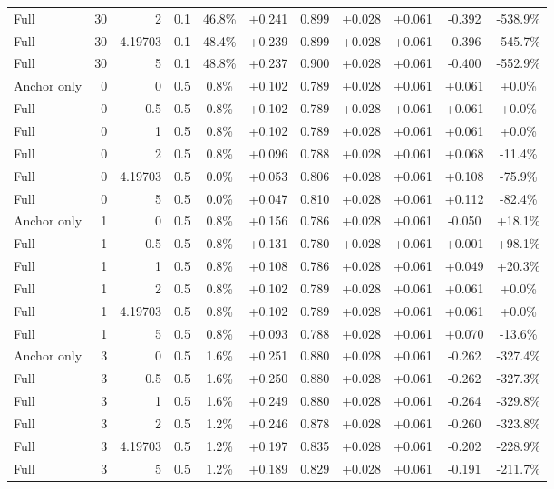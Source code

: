 \begin{table}[htbp]
\begin{tabular}{lrrrccccccc}
Full & 30 & 2 & 0.1 & 46.8\% & +0.241 & 0.899 & +0.028 & +0.061 & -0.392 & -538.9\% \\
Full & 30 & 4.19703 & 0.1 & 48.4\% & +0.239 & 0.899 & +0.028 & +0.061 & -0.396 & -545.7\% \\
Full & 30 & 5 & 0.1 & 48.8\% & +0.237 & 0.900 & +0.028 & +0.061 & -0.400 & -552.9\% \\
Anchor only & 0 & 0 & 0.5 & 0.8\% & +0.102 & 0.789 & +0.028 & +0.061 & +0.061 & +0.0\% \\
Full & 0 & 0.5 & 0.5 & 0.8\% & +0.102 & 0.789 & +0.028 & +0.061 & +0.061 & +0.0\% \\
Full & 0 & 1 & 0.5 & 0.8\% & +0.102 & 0.789 & +0.028 & +0.061 & +0.061 & +0.0\% \\
Full & 0 & 2 & 0.5 & 0.8\% & +0.096 & 0.788 & +0.028 & +0.061 & +0.068 & -11.4\% \\
Full & 0 & 4.19703 & 0.5 & 0.0\% & +0.053 & 0.806 & +0.028 & +0.061 & +0.108 & -75.9\% \\
Full & 0 & 5 & 0.5 & 0.0\% & +0.047 & 0.810 & +0.028 & +0.061 & +0.112 & -82.4\% \\
Anchor only & 1 & 0 & 0.5 & 0.8\% & +0.156 & 0.786 & +0.028 & +0.061 & -0.050 & +18.1\% \\
Full & 1 & 0.5 & 0.5 & 0.8\% & +0.131 & 0.780 & +0.028 & +0.061 & +0.001 & +98.1\% \\
Full & 1 & 1 & 0.5 & 0.8\% & +0.108 & 0.786 & +0.028 & +0.061 & +0.049 & +20.3\% \\
Full & 1 & 2 & 0.5 & 0.8\% & +0.102 & 0.789 & +0.028 & +0.061 & +0.061 & +0.0\% \\
Full & 1 & 4.19703 & 0.5 & 0.8\% & +0.102 & 0.789 & +0.028 & +0.061 & +0.061 & +0.0\% \\
Full & 1 & 5 & 0.5 & 0.8\% & +0.093 & 0.788 & +0.028 & +0.061 & +0.070 & -13.6\% \\
Anchor only & 3 & 0 & 0.5 & 1.6\% & +0.251 & 0.880 & +0.028 & +0.061 & -0.262 & -327.4\% \\
Full & 3 & 0.5 & 0.5 & 1.6\% & +0.250 & 0.880 & +0.028 & +0.061 & -0.262 & -327.3\% \\
Full & 3 & 1 & 0.5 & 1.6\% & +0.249 & 0.880 & +0.028 & +0.061 & -0.264 & -329.8\% \\
Full & 3 & 2 & 0.5 & 1.2\% & +0.246 & 0.878 & +0.028 & +0.061 & -0.260 & -323.8\% \\
Full & 3 & 4.19703 & 0.5 & 1.2\% & +0.197 & 0.835 & +0.028 & +0.061 & -0.202 & -228.9\% \\
Full & 3 & 5 & 0.5 & 1.2\% & +0.189 & 0.829 & +0.028 & +0.061 & -0.191 & -211.7\% \\

\end{tabular}
\end{table}
